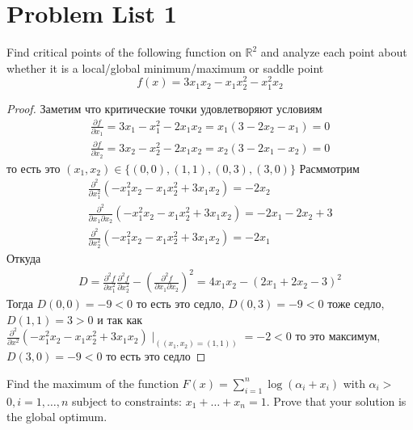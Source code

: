 \section{Problem List 1}


\begin{prob}
    Find critical points of the following function on $\mathbb{R}^2$ and analyze each point about whether it is a local/global minimum/maximum or saddle point
    $$
    f(x) = 3 x_1 x_2 - x_1 x_2^2 - x_1^2 x_2
    $$
\end{prob}

\begin{proof}
    Заметим что критические точки удовлетворяют условиям
    \begin{gather*}
        \frac{\partial f}{\partial x_1} = 3x_1 - x_1^2 - 2x_1 x_2 = x_1 (3 - 2x_2 - x_1) = 0\\
        \frac{\partial f}{\partial x_2} = 3x_2 - x_2^2 - 2x_1 x_2 = x_2 (3 - 2x_1 - x_2) = 0
    \end{gather*}
    то есть это
    $(x_1, x_2) \in \{(0,0), (1, 1), (0, 3), (3, 0)\}$
    Расммотрим
    \begin{gather*}
        \frac{\partial^2}{\partial x_1^2} (-x_1^2 x_2 - x_1 x_2^2 + 3 x_1 x_2) = -2x_2\\
        \frac{\partial^2}{\partial x_1 \partial x_2} (-x_1^2 x_2 - x_1 x_2^2 + 3 x_1 x_2) = -2x_1 - 2x_2 + 3\\
        \frac{\partial^2}{\partial x_2^2} (-x_1^2 x_2 - x_1 x_2^2 + 3 x_1 x_2) = -2x_1
    \end{gather*}
    Откуда
    \begin{gather*}
        D = \frac{\partial^2 f}{\partial x_1^2} \frac{\partial^2 f}{\partial x_2^2} - \left(\frac{\partial^2 f}{\partial x_1 \partial x_2}\right)^2 = 4x_1 x_2 - (2x_1 + 2x_2 - 3)^2
    \end{gather*}
    Тогда $D(0,0) = -9 < 0$ то есть это седло, $D(0,3) = -9 < 0$ тоже седло, $D(1,1) = 3 > 0$ и так как $\frac{\partial^2}{\partial x^2} (-x_1^2 x_2 - x_1 x_2^2 + 3x_1 x_2) \mid_{((x_1,x_2)=(1,1))} = -2 < 0$ то это максимум, $D(3,0) = -9 < 0$ то есть это седло
\end{proof}
\vskip 0.4in





\begin{prob}
    Find the maximum of the function $F(x)=\sum_{i=1}^n \log \left(\alpha_i+x_i\right)$ with $\alpha_i>$ $0, i=1, \ldots, n$ subject to constraints: $x_1+\ldots+x_n=1$. Prove that your solution is the global optimum.
\end{prob}

